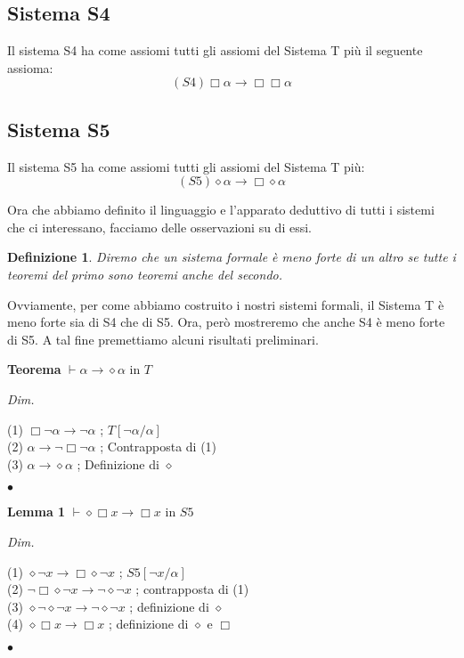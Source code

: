 \documentclass[a4paper, 12pt]{article}
\newtheorem{definition}{Definizione}
\begin{document}
\subsection{Sistema S4}
Il sistema S4 ha come assiomi tutti gli assiomi del Sistema T più il seguente assioma:
$$(S4) \Box \alpha \rightarrow \Box \Box \alpha$$

\subsection{Sistema S5}
Il sistema S5 ha come assiomi tutti gli assiomi del Sistema T più:
$$(S5) \diamond \alpha \rightarrow \Box \diamond \alpha$$


Ora che abbiamo definito il linguaggio e l'apparato deduttivo di tutti i sistemi
che ci interessano, facciamo delle osservazioni su di essi.
\begin{definition}
Diremo che un sistema formale è meno forte di un altro se tutte i teoremi del primo
sono teoremi anche del secondo.
\end{definition}

Ovviamente, per come abbiamo costruito i nostri sistemi formali, il Sistema T è meno forte
sia di S4 che di S5.
Ora, però mostreremo che anche S4 è meno forte di S5. A tal fine premettiamo alcuni risultati
preliminari.

\begin{flushleft}
\textbf{Teorema}
$\vdash \alpha \rightarrow \diamond \alpha$ in $T$

\textit{Dim.}

(1) $\Box \neg \alpha \rightarrow \neg \alpha$ ; $T[\neg \alpha/\alpha]$ \\
(2) $\alpha \rightarrow \neg \Box \neg \alpha$ ; Contrapposta di (1) \\
(3) $\alpha \rightarrow \diamond \alpha$ ; Definizione di $\diamond$

\begin{flushright}
$\bullet$
\end{flushright}
\end{flushleft}

\begin{flushleft}
\textbf{Lemma 1}
$\vdash \diamond \Box x \rightarrow \Box x$ in $S5$

\textit{Dim.}

(1) $\diamond \neg x \rightarrow \Box \diamond \neg x$ ; $S5[\neg x/\alpha]$ \\
(2) $\neg \Box \diamond \neg x \rightarrow \neg \diamond \neg x$ ; contrapposta di (1) \\
(3) $\diamond \neg \diamond \neg x \rightarrow \neg \diamond \neg x$ ; definizione di $\diamond$ \\
(4) $\diamond \Box x \rightarrow \Box x$ ; definizione di $\diamond$ e $\Box$

\begin{flushright}
$\bullet$
\end{flushright}
\end{flushleft}
\end{document}
